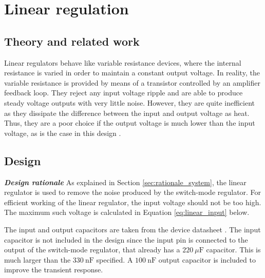 \chapter{Linear regulation}
\section{Theory and related work} \label{sec:literature_linear}
Linear regulators behave like variable resistance devices, where the internal resistance is varied in order to maintain a constant output voltage. In reality, the variable resistance is provided by means of a transistor controlled by an amplifier feedback loop. They reject any input voltage ripple and are able to produce steady voltage outputs with very little noise. However, they are quite inefficient as they dissipate the difference between the input and output voltage as heat. Thus, they are a poor choice if the output voltage is much lower than the input voltage, as is the case in this design \cite{regulators-main}.


\section{Design} \label{sec:design_linear}
\textbf{\textit{Design rationale}}
As explained in Section \ref{sec:rationale_system}, the linear regulator is used to remove the noise produced by the switch-mode regulator. For efficient working of the linear regulator, the input voltage should not be too high. The maximum such voltage is calculated in Equation \ref{eq:linear_input} below.

The input and output capacitors are taken from the device datasheet \cite{LM7805}. The input capacitor is not included in the design since the input pin is connected to the output of the switch-mode regulator, that already has a $\SI{220}{\mu\farad}$ capacitor. This is much larger than the $\SI{330}{\nano\farad}$ specified. A $\SI{100}{\nano\farad}$ output capacitor is included to improve the transient response.


